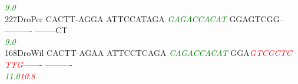 \documentclass[11pt,twoside,reqno,a4paper]{article}
\begin{document}
{\hspace*{4\charwidth}\hspace*{7\charwidth}\hspace*{1\charwidth}\hspace*{1\charwidth}\hspace*{20\charwidth}\textit{\textcolor{green}{9.0}}\hspace*{1\charwidth}\hspace*{1\charwidth}\hspace*{1\charwidth}\hspace*{1\charwidth}\\
227\hspace*{1\charwidth}DroPer	CACTT-AGGA	ATTCCATAGA	\textit{\textcolor{green}{G}}\textit{\textcolor{green}{A}}\textit{\textcolor{green}{G}}\textit{\textcolor{green}{A}}\textit{\textcolor{green}{C}}\textit{\textcolor{green}{C}}\textit{\textcolor{green}{A}}\textit{\textcolor{green}{C}}\textit{\textcolor{green}{A}}\textit{\textcolor{green}{T}}	GGAGTCGG--	----------	--------CT	\\
\hspace*{4\charwidth}\hspace*{7\charwidth}\hspace*{1\charwidth}\hspace*{1\charwidth}\hspace*{20\charwidth}\textit{\textcolor{green}{9.0}}\hspace*{1\charwidth}\hspace*{1\charwidth}\hspace*{1\charwidth}\hspace*{1\charwidth}\\
168\hspace*{1\charwidth}DroWil	CACTT-AGAA	ATTCCTCAGA	\textit{\textcolor{green}{C}}\textit{\textcolor{green}{A}}\textit{\textcolor{green}{G}}\textit{\textcolor{green}{A}}\textit{\textcolor{green}{C}}\textit{\textcolor{green}{C}}\textit{\textcolor{green}{A}}\textit{\textcolor{green}{C}}\textit{\textcolor{green}{A}}\textit{\textcolor{green}{T}}	GGA\textit{\textcolor{red}{G}}\textit{\textcolor{red}{T}}\textit{\textcolor{red}{C}}\textit{\textcolor{red}{G}}\textit{\textcolor{red}{C}}\textit{\textcolor{red}{T}}\textit{\textcolor{red}{C}}	\textit{\textcolor{red}{T}}\textit{\textcolor{red}{T}}\textit{\textcolor{red}{G}}-------	----------	\\
\hspace*{4\charwidth}\hspace*{7\charwidth}\hspace*{1\charwidth}\hspace*{1\charwidth}\hspace*{20\charwidth}\textit{\textcolor{green}{11.0}}\hspace*{1\charwidth}\hspace*{9\charwidth}\textit{\textcolor{red}{10.8}}\hspace*{1\charwidth}\hspace*{1\charwidth}\hspace*{1\charwidth}\\
}
\end{document}
